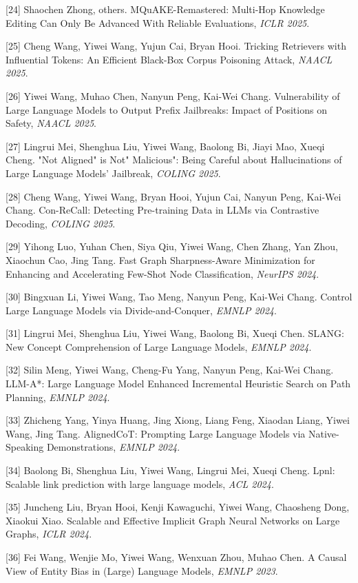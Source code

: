 [24] Shaochen Zhong, others. MQuAKE-Remastered: Multi-Hop Knowledge Editing Can Only Be Advanced With Reliable Evaluations, \textit{ICLR 2025}.

[25] Cheng Wang, Yiwei Wang, Yujun Cai, Bryan Hooi. Tricking Retrievers with Influential Tokens: An Efficient Black-Box Corpus Poisoning Attack, \textit{NAACL 2025}.

[26] Yiwei Wang, Muhao Chen, Nanyun Peng, Kai-Wei Chang. Vulnerability of Large Language Models to Output Prefix Jailbreaks: Impact of Positions on Safety, \textit{NAACL 2025}.

[27] Lingrui Mei, Shenghua Liu, Yiwei Wang, Baolong Bi, Jiayi Mao, Xueqi Cheng. "Not Aligned" is Not" Malicious": Being Careful about Hallucinations of Large Language Models' Jailbreak, \textit{COLING 2025}.

[28] Cheng Wang, Yiwei Wang, Bryan Hooi, Yujun Cai, Nanyun Peng, Kai-Wei Chang. Con-ReCall: Detecting Pre-training Data in LLMs via Contrastive Decoding, \textit{COLING 2025}.

[29] Yihong Luo, Yuhan Chen, Siya Qiu, Yiwei Wang, Chen Zhang, Yan Zhou, Xiaochun Cao, Jing Tang. Fast Graph Sharpness-Aware Minimization for Enhancing and Accelerating Few-Shot Node Classification, \textit{NeurIPS 2024}.

[30] Bingxuan Li, Yiwei Wang, Tao Meng, Nanyun Peng, Kai-Wei Chang. Control Large Language Models via Divide-and-Conquer, \textit{EMNLP 2024}.

[31] Lingrui Mei, Shenghua Liu, Yiwei Wang, Baolong Bi, Xueqi Chen. SLANG: New Concept Comprehension of Large Language Models, \textit{EMNLP 2024}.

[32] Silin Meng, Yiwei Wang, Cheng-Fu Yang, Nanyun Peng, Kai-Wei Chang. LLM-A*: Large Language Model Enhanced Incremental Heuristic Search on Path Planning, \textit{EMNLP 2024}.

[33] Zhicheng Yang, Yinya Huang, Jing Xiong, Liang Feng, Xiaodan Liang, Yiwei Wang, Jing Tang. AlignedCoT: Prompting Large Language Models via Native-Speaking Demonstrations, \textit{EMNLP 2024}.

[34] Baolong Bi, Shenghua Liu, Yiwei Wang, Lingrui Mei, Xueqi Cheng. Lpnl: Scalable link prediction with large language models, \textit{ACL 2024}.

[35] Juncheng Liu, Bryan Hooi, Kenji Kawaguchi, Yiwei Wang, Chaosheng Dong, Xiaokui Xiao. Scalable and Effective Implicit Graph Neural Networks on Large Graphs, \textit{ICLR 2024}.

[36] Fei Wang, Wenjie Mo, Yiwei Wang, Wenxuan Zhou, Muhao Chen. A Causal View of Entity Bias in (Large) Language Models, \textit{EMNLP 2023}.

